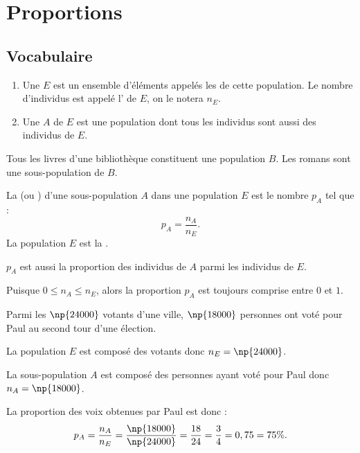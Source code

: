 \documentclass[10pt,openright,twoside,french]{book}
\begin{document}
\chapter{Proportions}\label{ch_proportion}

\section{Vocabulaire}

\begin{Defi}
    \begin{enumerate}
        \item Une  $E$ est un ensemble d'éléments appelés les  de cette population. Le nombre d'individus est appelé l' de $E$, on le notera $n_E$.
        \item Une  $A$ de $E$ est une population dont tous les individus sont aussi des individus de $E$.
    \end{enumerate}
\end{Defi}

\begin{Exemple}
    Tous les livres d'une bibliothèque constituent une population $B$. Les romans sont une sous-population de $B$.
\end{Exemple}

\begin{Defi}
    La  (ou ) d'une sous-population $A$ dans une population $E$ est le nombre $p_A$ tel que :
    \[p_A = \frac{n_A}{n_E}.\]
    La population $E$ est la .\par
    $p_A$ est aussi la proportion des individus de $A$ parmi les individus de $E$.
\end{Defi}

\begin{Rmq}
    Puisque $0 \leq n_A \leq n_E$, alors la proportion $p_A$ est toujours comprise entre $0$ et $1$.
\end{Rmq}

\begin{Exemple}
    Parmi les $\np{24000}$ votants d'une ville, $\np{18000}$ personnes ont voté pour Paul au second tour d'une élection.\par
    La population $E$ est composé des votants donc $n_E = \np{24000}$.\par
    La sous-population $A$ est composé des personnes ayant voté pour Paul donc $n_A = \np{18000}$.\par
    La proportion des voix obtenues par Paul est donc : \[p_A = \frac{n_A}{n_E} = \frac{\np{18000}}{\np{24000}} = \frac{18}{24} = \frac{3}{4} = 0,75 = 75\%.\]
\end{Exemple}
\end{document}
